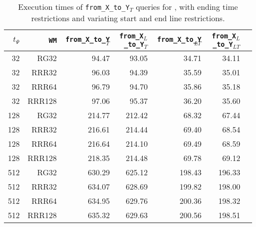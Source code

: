 \begin{table}[hbpt!]
\caption{Execution times of \texttt{from\_X\_to\_Y$_T$} queries for \ttctr, with ending time restrictions and variating start and end line restrictions.}
\begin{tabular}{|r|r|r|r|r|r|r|}
\hline
$t_{\Psi}$ & \texttt{WM} & \texttt{from\_X\_to\_Y$_{T}$} & \texttt{from\_X$_{L}$\_to\_Y$_{T}$} & \texttt{from\_X\_to\_Y$_{LT}$} & \texttt{from\_X$_{L}$\_to\_Y$_{LT}$} \\
\hline
32 & RG32 & 94.47 & 93.05 & 34.71 & 34.11 \\
32 & RRR32 & 96.03 & 94.39 & 35.59 & 35.01 \\
32 & RRR64 & 96.79 & 94.70 & 35.86 & 35.18 \\
32 & RRR128 & 97.06 & 95.37 & 36.20 & 35.60 \\
128 & RG32 & 214.77 & 212.42 & 68.32 & 67.44 \\
128 & RRR32 & 216.61 & 214.44 & 69.40 & 68.54 \\
128 & RRR64 & 216.64 & 214.10 & 69.49 & 68.59 \\
128 & RRR128 & 218.35 & 214.48 & 69.78 & 69.12 \\
512 & RG32 & 630.29 & 625.12 & 198.43 & 196.33 \\
512 & RRR32 & 634.07 & 628.69 & 199.82 & 198.00 \\
512 & RRR64 & 634.95 & 629.76 & 200.36 & 198.32 \\
512 & RRR128 & 635.32 & 629.63 & 200.56 & 198.51 \\
\hline
\end{tabular}
\end{table}


